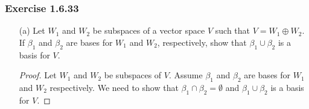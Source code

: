 \subsubsection{Exercise 1.6.33} 
\begin{enumerate}
    \item[(a)] Let \( W_{1} \) and \( W_{2} \) be subspaces of a vector space \( V  \) such that \( V = W_{1} \oplus W_{2} \). If \( \beta_{1}  \) and \( \beta_{2} \) are bases for \( W_{1} \) and \( W_{2} \), respectively, show that \( \beta_{1} \cup \beta_{2} \) is a basis for \( V  \).
        \begin{proof}
            Let \( W_{1}  \) and \( W_{2} \) be subspaces of \( V  \). Assume \( \beta_{1} \) and \( \beta_{2}  \) are bases for \( W_{1} \) and \( W_{2} \) respectively. We need to show that \( \beta_{1} \cap \beta_{2} = \emptyset \) and \( \beta_{1} \cup \beta_{2} \) is a basis for \( V  \). 


\end{proof}
\end{enumerate}
